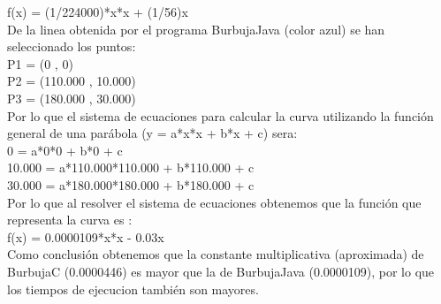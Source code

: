 	f(x) = (1/224000)*x*x + (1/56)x\\
	
	De la linea obtenida por el programa BurbujaJava (color azul) se han seleccionado los puntos:\\
	
	P1 = (0 , 0)\\
	P2 = (110.000 , 10.000)\\
	P3 = (180.000 , 30.000)\\
	
	Por lo que el sistema de ecuaciones para calcular la curva utilizando la función general de una parábola (y = a*x*x + b*x + c) sera:\\
	
	0 = a*0*0 + b*0 + c\\
	10.000 = a*110.000*110.000 + b*110.000 + c\\
	30.000 = a*180.000*180.000 + b*180.000 + c\\
	
	Por lo que al resolver el sistema de ecuaciones obtenemos que la función que representa la curva es :\\
	
	f(x) = 0.0000109*x*x - 0.03x\\
	
	Como conclusión obtenemos que la constante multiplicativa (aproximada) de BurbujaC (0.0000446) es mayor que la de BurbujaJava (0.0000109), por lo que los tiempos de ejecucion también son mayores.


	


